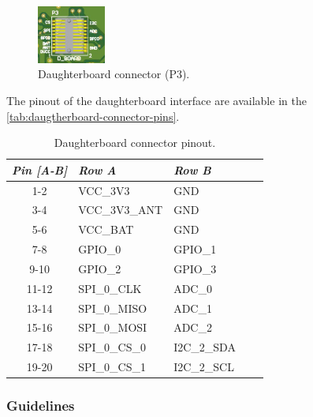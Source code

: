 \begin{figure}[!ht]
    \begin{center}
        \includegraphics[width=0.2\textwidth]{figures/p3-connector.png}
        \caption{Daughterboard connector (P3).}
        \label{fig:daughterboard-connector}
    \end{center}
\end{figure}

The pinout of the daughterboard interface are available in the \autoref{tab:daugtherboard-connector-pins}.

\begin{table}[!h]
    \centering
    \begin{tabular}{cllll}
        \toprule[1.5pt]
        \textit{Pin [A-B]} & \textit{Row A} & \textit{Row B} \\
        \midrule
        1-2                & VCC\_3V3       & GND            \\
        3-4                & VCC\_3V3\_ANT  & GND            \\
        5-6                & VCC\_BAT       & GND            \\
        7-8                & GPIO\_0        & GPIO\_1        \\
        9-10               & GPIO\_2        & GPIO\_3        \\
        11-12              & SPI\_0\_CLK    & ADC\_0         \\
        13-14              & SPI\_0\_MISO   & ADC\_1         \\
        15-16              & SPI\_0\_MOSI   & ADC\_2         \\
        17-18              & SPI\_0\_CS\_0  & I2C\_2\_SDA    \\
        19-20              & SPI\_0\_CS\_1  & I2C\_2\_SCL    \\
        \bottomrule[1.5pt]
    \end{tabular}
    \caption{Daughterboard connector pinout.}
    \label{tab:daugtherboard-connector-pins}
\end{table}

\subsubsection{Guidelines}

